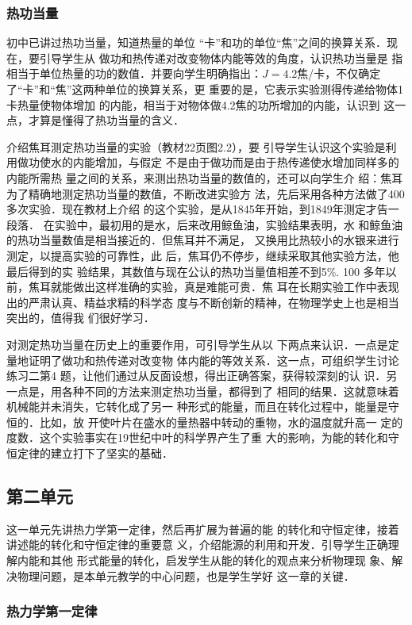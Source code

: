 \subsubsection{热功当量} 初中已讲过热功当量，知道热量的单位
“卡”和功的单位“焦”之间的换算关系．现在，要引导学生从
做功和热传递对改变物体内能等效的角度，认识热功当量是
指相当于单位热量的功的数值．并要向学生明确指出：$J=
4.2$焦/卡，不仅确定了“卡”和“焦”这两种单位的换算关系，更
重要的是，它表示实验测得传递给物体1卡热量使物体增加
的内能，相当于对物体做4.2焦的功所增加的内能，认识到
这一点，才算是懂得了热功当量的含义．

介绍焦耳测定热功当量的实验（教材22页图2.2），要
引导学生认识这个实验是利用做功使水的内能增加，与假定
不是由于做功而是由于热传递使水增加同样多的内能所需热
量之间的关系，来测出热功当量的数值的，还可以向学生介
绍：焦耳为了精确地测定热功当量的数值，不断改进实验方
法，先后采用各种方法做了400多次实验．现在教材上介绍
的这个实验，是从1845年开始，到1849年测定才告一段落．
在实验中，最初用的是水，后来改用鲸鱼油，实验结果表明，水
和鲸鱼油的热功当量数值是相当接近的．但焦耳并不满足，
又换用比热较小的水银来进行测定，以提高实验的可靠性，此
后，焦耳仍不停步，继续采取其他实验方法，他最后得到的实
验结果，其数值与现在公认的热功当量值相差不到5\%. 100
多年以前，焦耳就能做出这样准确的实验，真是难能可贵．焦
耳在长期实验工作中表现出的严肃认真、精益求精的科学态
度与不断创新的精神，在物理学史上也是相当突出的，值得我
们很好学习．

对测定热功当量在历史上的重要作用，可引导学生从以
下两点来认识．一点是定量地证明了做功和热传递对改变物
体内能的等效关系．这一点，可组织学生讨论练习二第4
题，让他们通过从反面设想，得出正确答案，获得较深刻的认
识．另一点是，用各种不同的方法来测定热功当量，都得到了
相同的结果．这就意味着机械能并未消失，它转化成了另一
种形式的能量，而且在转化过程中，能量是守恒的．比如，放
开使叶片在盛水的量热器中转动的重物，水的温度就升高一
定的度数．这个实验事实在19世纪中叶的科学界产生了重
大的影响，为能的转化和守恒定律的建立打下了坚实的基础．

\subsection{第二单元}
这一单元先讲热力学第一定律，然后再扩展为普遍的能
的转化和守恒定律，接着讲述能的转化和守恒定律的重要意
义，介绍能源的利用和开发．引导学生正确理解内能和其他
形式能量的转化，启发学生从能的转化的观点来分析物理现
象、解决物理问题，是本单元教学的中心问题，也是学生学好
这一章的关键．

\subsubsection{热力学第一定律}


